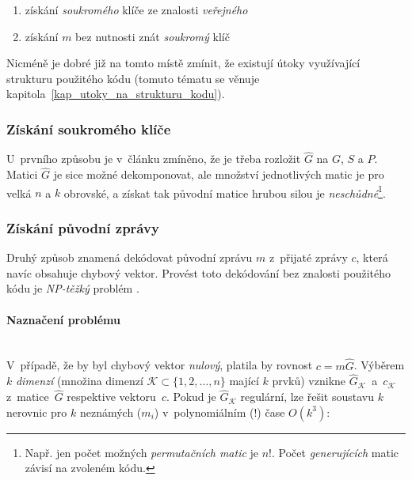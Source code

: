 \documentclass[thesis=M,czech,hidelinks]{FITthesis}[2012/06/26]
\newcommand{\0}{{\textcolor[gray]{0.80}{0}}}
\begin{document}
\begin{enumerate}
    \item získání \emph{soukromého} klíče ze znalosti \emph{veřejného}
    \item získání $m$ bez nutnosti znát \emph{soukromý} klíč
\end{enumerate}

Nicméně je dobré již na tomto místě zmínit, že existují útoky využívající
strukturu použitého kódu (tomuto tématu se věnuje
kapitola~\ref{kap_utoky_na_strukturu_kodu}).

\subsubsection{Získání soukromého klíče}

U~prvního způsobu je v~článku zmíněno, že je třeba rozložit $\hat{G}$ na $G$,
$S$ a $P$.  Matici $\hat{G}$ je sice možné dekomponovat, ale množství
jednotlivých matic je pro velká $n$ a $k$ obrovské, a získat tak původní matice
hrubou silou je \emph{neschůdné}\footnote{
    Např. jen počet možných \emph{permutačních matic} je $n!$. Počet
    \emph{generujících} matic závisí na zvoleném kódu.
}.


\subsubsection{Získání původní zprávy}

Druhý způsob znamená dekódovat původní zprávu $m$ z~přijaté zprávy $c$, která
navíc obsahuje chybový vektor. Provést toto dekódování bez znalosti použitého
kódu je \emph{NP-těžký} problém \cite{Berlekamp}.

\paragraph{Naznačení problému} \hfil \\
V~případě, že by byl chybový vektor \emph{nulový}, platila by rovnost $c =
m\hat{G}$. Výběrem $k$ \emph{dimenzí} (množina dimenzí $\mathcal{K} \subset
\{1,2,\ldots,n\}$ mající $k$ prvků) vznikne
$\hat{G}_{\mathcal{K}}$~a~$c_{\mathcal{K}}$ z~matice~$\hat{G}$ respektive
vektoru~$c$. Pokud je $\hat{G}_{\mathcal{K}}$ regulární, lze řešit soustavu $k$
nerovnic pro $k$ neznámých ($m_i$) v~polynomiálním (!) čase $O\left(k^3\right)$:
\end{document}
